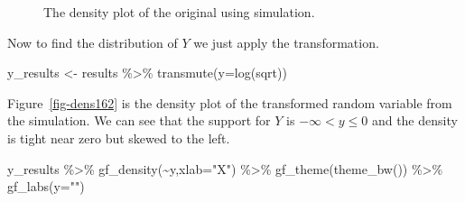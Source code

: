 \documentclass[
  letterpaper,
  DIV=11,
  numbers=noendperiod]{scrreprt}
\newenvironment{Shaded}{\begin{snugshade}}{\end{snugshade}}
\newcommand{\AttributeTok}[1]{\textcolor[rgb]{0.40,0.45,0.13}{#1}}
\newcommand{\FunctionTok}[1]{\textcolor[rgb]{0.28,0.35,0.67}{#1}}
\newcommand{\NormalTok}[1]{\textcolor[rgb]{0.00,0.23,0.31}{#1}}
\newcommand{\OtherTok}[1]{\textcolor[rgb]{0.00,0.23,0.31}{#1}}
\newcommand{\SpecialCharTok}[1]{\textcolor[rgb]{0.37,0.37,0.37}{#1}}
\newcommand{\StringTok}[1]{\textcolor[rgb]{0.13,0.47,0.30}{#1}}
\begin{document}
\begin{figure}[H]


\caption{\label{fig-dens161}The density plot of the original using
simulation.}

\end{figure}%

Now to find the distribution of \(Y\) we just apply the transformation.

\begin{Shaded}
\begin{Highlighting}[]
\NormalTok{y\_results }\OtherTok{\textless{}{-}}\NormalTok{ results }\SpecialCharTok{\%\textgreater{}\%}
  \FunctionTok{transmute}\NormalTok{(}\AttributeTok{y=}\FunctionTok{log}\NormalTok{(sqrt))}
\end{Highlighting}
\end{Shaded}

Figure~\ref{fig-dens162} is the density plot of the transformed random
variable from the simulation. We can see that the support for \(Y\) is
\(-\infty < y \leq 0\) and the density is tight near zero but skewed to
the left.

\begin{Shaded}
\begin{Highlighting}[]
\NormalTok{y\_results }\SpecialCharTok{\%\textgreater{}\%}
  \FunctionTok{gf\_density}\NormalTok{(}\SpecialCharTok{\textasciitilde{}}\NormalTok{y,}\AttributeTok{xlab=}\StringTok{"X"}\NormalTok{)  }\SpecialCharTok{\%\textgreater{}\%}
  \FunctionTok{gf\_theme}\NormalTok{(}\FunctionTok{theme\_bw}\NormalTok{()) }\SpecialCharTok{\%\textgreater{}\%}
  \FunctionTok{gf\_labs}\NormalTok{(}\AttributeTok{y=}\StringTok{""}\NormalTok{)}
\end{Highlighting}
\end{Shaded}
\end{document}
